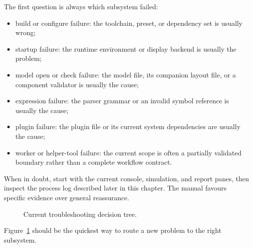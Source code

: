 The first question is always which subsystem failed:
\begin{itemize}
\item build or configure failure: the toolchain, preset, or dependency set is
usually wrong;
\item startup failure: the runtime environment or display backend is usually
the problem;
\item model open or check failure: the model file, its companion layout file,
or a component validator is usually the cause;
\item expression failure: the parser grammar or an invalid symbol reference is
usually the cause;
\item plugin failure: the plugin file or its current system dependencies are
usually the cause;
\item worker or helper-tool failure: the current scope is often a partially
validated boundary rather than a complete workflow contract.
\end{itemize}

When in doubt, start with the current console, simulation, and report panes,
then inspect the process log described later in this chapter. The manual
favours specific evidence over general reassurance.

\begin{figure}[htbp]
\centering
\caption{Current troubleshooting decision tree.}
\label{fig:troubleshooting-decision-tree}
\end{figure}

Figure~\ref{fig:troubleshooting-decision-tree} should be the quickest way to
route a new problem to the right subsystem.

